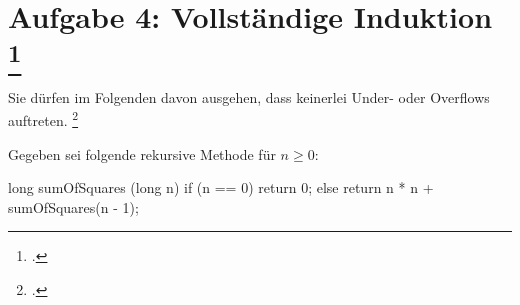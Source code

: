 \documentclass{bschlangaul-aufgabe}
\begin{document}
\let\m=\bInduktionMarkierung
\let\e=\bInduktionErklaerung


\section{Aufgabe 4: Vollständige Induktion
\footcite{sosy:ab:8}
}

Sie dürfen im Folgenden davon ausgehen, dass keinerlei Under- oder
Overflows auftreten.
\footcite[Thema 1 Aufgabe 4]{examen:66115:2017:03}

\bigskip

\noindent
Gegeben sei folgende rekursive Methode für $n \geq 0$:

\begin{bJavaAngabe}
long sumOfSquares (long n) {
  if (n == 0)
    return 0;
  else
    return n * n + sumOfSquares(n - 1);
}
\end{bJavaAngabe}
\end{document}
